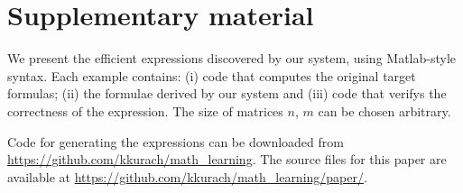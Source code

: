 \documentclass{article} %
\begin{document}
\small



\pagebreak
\section{Supplementary material}
We present the efficient expressions discovered by our system, using
Matlab-style syntax. Each example contains: (i) code that computes the
original target formulas; (ii) the formulae derived by our system and
(iii) code that verifys the correctness of the expression. The size of
matrices $n$, $m$ can be chosen arbitrary.

Code for generating the expressions can be downloaded from \url{https://github.com/kkurach/math_learning}.
The source files for this paper are available at \url{https://github.com/kkurach/math_learning/paper/}.


\end{document}
